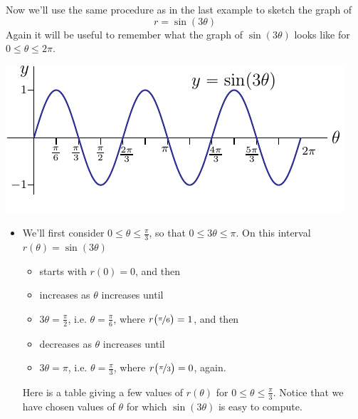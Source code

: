 \begin{eg}\label{eg rose}
Now we'll use the same procedure as in the last example to sketch
the graph of 
\begin{equation*}
r=\sin(3\theta)
\end{equation*}
Again it will be useful to remember 
what the graph of $\sin(3\theta)$ looks like for $0\le\theta\le 2\pi$.
\begin{efig}
\begin{center}
    \includegraphics{sin3Graph.pdf}
\end{center}
\end{efig}
\begin{itemize}
\item 
We'll first consider $0\le\theta\le\frac{\pi}{3}$, so that
$0\le 3\theta \le \pi$. On this interval $r(\theta)=\sin(3\theta)$
   \begin{itemize}\itemsep1pt \parskip0pt 
        \item
          starts with $r(0)=0$, and then
        \item
          increases as $\theta$ increases until
        \item
         $3\theta=\frac{\pi}{2}$, i.e. $\theta=\frac{\pi}{6}$,
          where $r\big(\nicefrac{\pi}{6}\big)=1$, and then
        \item
          decreases as $\theta$ increases until
        \item
         $3\theta=\pi$, i.e. $\theta=\frac{\pi}{3}$,
          where $r\big(\nicefrac{\pi}{3}\big)=0$, again.
   \end{itemize}  
Here is a table giving a few values of $r(\theta)$ for 
  $0\le \theta\le\frac{\pi}{3}$. Notice that we have chosen values of 
$\theta$ for which $\sin(3\theta)$ is easy to compute.


\end{itemize}
\end{eg}
